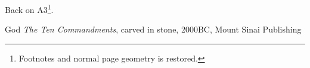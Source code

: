 \documentclass[11pt,twoside,a4paper,pagesize]{report}
\begin{document}
\clearpage
Back on A3\footnote{Footnotes and normal page geometry is restored.}.



\renewcommand{\bibname}{References}

\begin{thebibliography}{1}
    God {\em The Ten Commandments}, carved in stone, 2000BC, Mount Sinai Publishing
\end{thebibliography}
\end{document}
